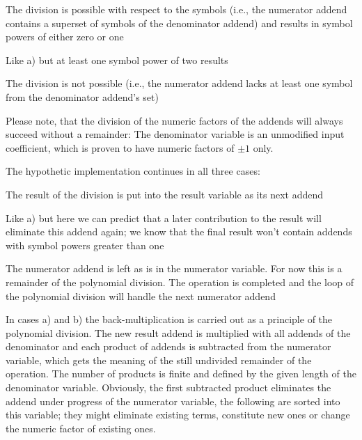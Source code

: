 \begin{compactenum}[a)]
  \item The division is possible with respect to the symbols (i.e., the
    numerator addend contains a superset of symbols of the denominator
    addend) and results in symbol powers of either zero or one
  \item Like a) but at least one symbol power of two results
  \item The division is not possible (i.e., the numerator addend lacks
    at least one symbol from the denominator addend's set)
\end{compactenum}

Please note, that the division of the numeric factors of the addends will
always succeed without a remainder: The denominator variable is an
unmodified input coefficient, which is proven to have numeric factors
of $\pm 1$ only.

The hypothetic implementation continues in all three cases:
\begin{compactenum}[a)]
  \item The result of the division is put into the result variable as
    its next addend
  \item Like a) but here we can predict that a later contribution to
    the result will eliminate this addend again; we know that the final
    result won't contain addends with symbol powers greater than one
  \item The numerator addend is left as is in the numerator variable. For
    now this is a remainder of the polynomial division. The operation is
    completed and the loop of the polynomial division will handle the next
    numerator addend
\end{compactenum}

In cases a) and b) the back-multiplication is carried out as a principle
of the polynomial division. The new result addend is multiplied with all
addends of the denominator and each product of addends is subtracted from
the numerator variable, which gets the meaning of the still undivided
remainder of the operation. The number of products is finite and defined
by the given length of the denominator variable. Obviously, the first
subtracted product eliminates the addend under progress of the numerator
variable, the following are sorted into this variable; they might
eliminate existing terms, constitute new ones or change the numeric factor
of existing ones.

